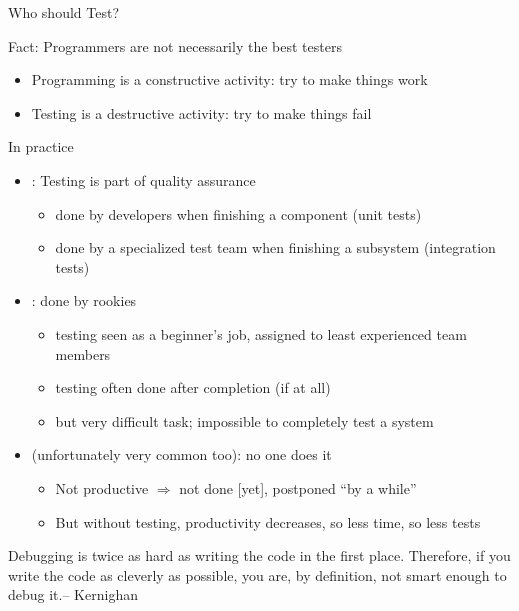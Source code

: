 \begin{frame}{Who should Test?}
  \begin{block}{Fact: Programmers are not necessarily the best testers}
    \begin{itemize}
    \item Programming is a constructive activity: try to make things work
    \item Testing is a destructive activity: try to make things fail
    \end{itemize}
  \end{block}\vspace{-.5\baselineskip}
  \begin{block}{In practice}
    \begin{itemize}
    \item {}: Testing is part of quality assurance
      \begin{itemize}
      \item done by developers when finishing a component (unit tests)
      \item done by a specialized test team when finishing a subsystem
        (integration tests)
      \end{itemize}
    \item {}: done by rookies
      \begin{itemize}
      \item testing seen as a beginner's job, assigned to least experienced
        team members
      \item testing often done after completion (if at all)
      \item but very difficult task; impossible to completely test a
        system
      \end{itemize}
    \item {} (unfortunately very common too): no one does it
      \begin{itemize}
      \item Not productive $\Rightarrow$ not done [yet], postponed ``by a while''
      \item But without testing, productivity decreases, so less time, so less
        tests
      \end{itemize}
    \end{itemize}
  \end{block}\vspace{-.5\baselineskip}

  \begin{boitequote}{}
    Debugging is twice as hard as writing the code in the first place.
    Therefore, if you write the code as cleverly as possible, you are, by
    definition, not smart enough to debug it.\hfill -- Kernighan
  \end{boitequote}
\end{frame}
